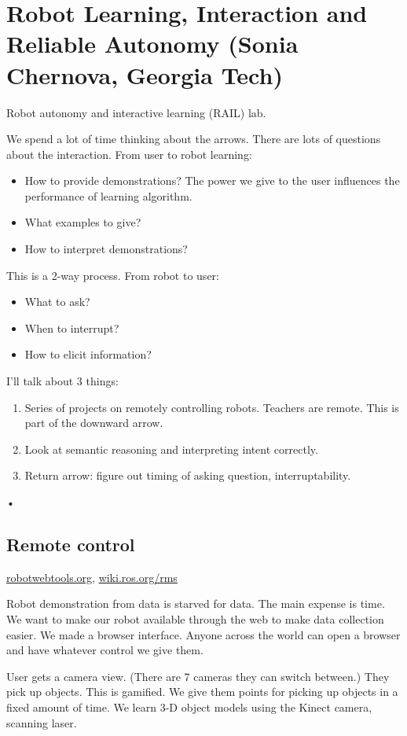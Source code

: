 \section{Robot Learning, Interaction and Reliable Autonomy (Sonia Chernova, Georgia Tech)}

Robot autonomy and interactive learning (RAIL) lab.

We spend a lot of time thinking about the arrows. There are lots of questions about the interaction. From user to robot learning:
\begin{itemize}
\item
How to provide demonstrations? The power we give to the user influences the performance of learning algorithm.
\item
What examples to give?
\item
How to interpret demonstrations?
\end{itemize}
This is a 2-way process. 
From robot to user:
\begin{itemize}
\item
What to ask?
\item
When to interrupt? %
\item
How to elicit information? %
\end{itemize}
I'll talk about 3 things:
\begin{enumerate}
\item
Series of projects on remotely controlling robots. Teachers are remote. This is part of the downward arrow.
\item
Look at semantic reasoning and interpreting intent correctly.
\item
Return arrow: figure out timing of asking question, interruptability.
\end{enumerate}•

\subsection{Remote control}
\url{robotwebtools.org}, \url{wiki.ros.org/rms} 

Robot demonstration from data is starved for data. The main expense is time. We want to make our robot available through the web to make data collection easier. We made a browser interface. Anyone across the world can open a browser and have whatever control we give them. 


User gets a camera view. (There are 7 cameras they can switch between.) They pick up objects.
This is gamified. We give them points for picking up objects in a fixed amount of time. We learn 3-D object models using the Kinect camera, scanning laser. %

